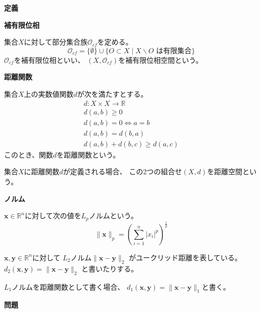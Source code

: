 \documentclass[12pt,b5paper]{ltjsarticle}
\begin{document}
\hrulefill
\textbf{定義}
\hrulefill

\textbf{補有限位相}

集合$X$に対して部分集合族$\mathcal{O}_{cf}$を定める。
\begin{equation}
 \mathcal{O}_{cf} = \{\emptyset\}\cup\{O\subset X \mid X\backslash O \text{ は有限集合}\}
\end{equation}
$\mathcal{O}_{cf}$を補有限位相といい、
$(X,\mathcal{O}_{cf})$を補有限位相空間という。


\textbf{距離関数}

集合$X$上の実数値関数$d$が次を満たすとする。
\begin{gather}
 d: X\times X \to \mathbb{R}\\
 d(a,b)\geq 0\\
 d(a,b)= 0 \Leftrightarrow a=b\\
 d(a,b) = d(b,a)\\
 d(a,b) + d(b,c) \geq d(a,c)
\end{gather}
このとき、関数$d$を距離関数という。

集合$X$に距離関数$d$が定義される場合、
この2つの組合せ$(X,d)$を距離空間という。

\textbf{ノルム}

$\bm{x}\in\mathbb{R}^n$に対して次の値を$L_{p}$ノルムという。
\begin{equation}
 \| \bm{x} \|_{p} = \left( \sum_{i=1}^{n}\lvert x_i\rvert^p \right)^{\frac{1}{p}}
\end{equation}

$\bm{x},\bm{y}\in\mathbb{R}^n$に対して
$L_{2}$ノルム$\| \bm{x}-\bm{y} \|_2$
がユークリッド距離を表している。
$d_{2}(\bm{x},\bm{y})=\| \bm{x}-\bm{y} \|_2$
と書いたりする。

$L_{1}$ノルムを距離関数として書く場合、
$d_{1}(\bm{x},\bm{y})=\| \bm{x}-\bm{y} \|_1$と書く。

\hrulefill
\textbf{問題}
\hrulefill
\end{document}
